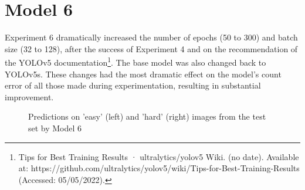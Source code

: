\section{Model 6}
Experiment 6 dramatically increased the number of epochs (50 to 300) and batch size (32 to 128), after the success of Experiment 4 and on the recommendation of the YOLOv5 documentation\footnote{Tips for Best Training Results · ultralytics/yolov5 Wiki. (no date). Available at: https://github.com/ultralytics/yolov5/wiki/Tips-for-Best-Training-Results (Accessed: 05/05/2022).}. The base model was also changed back to YOLOv5s. These changes had the most dramatic effect on the model's count error of all those made during experimentation, resulting in substantial improvement.

\begin{figure}
\caption{Predictions on 'easy' (left) and 'hard' (right) images from the test set by Model 6}
\label{model6}
\end{figure}

